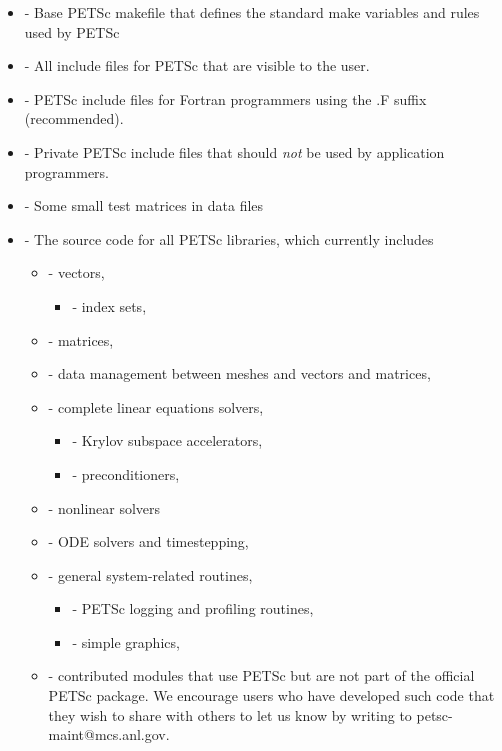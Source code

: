 \begin{itemize}
\item {} - Base PETSc makefile that defines the standard make variables and rules used by PETSc
\item {} - All include files for PETSc that are visible to the user.
\item {}    - PETSc include files for Fortran programmers using
                                  the .F suffix (recommended).
\item {}    - Private PETSc include files that should {\em not}
                                  be used by application programmers.
\item {} - Some small test matrices in data files
\item {} - The source code for all PETSc libraries, which
                  currently includes
 \begin{itemize}
 \item {} - vectors,
   \begin{itemize}
     \item {} - index sets,
   \end{itemize}
 \item {} - matrices,
 \item {} - data management between meshes and vectors and matrices,
 \item {} - complete linear equations solvers,
 \begin{itemize}
   \item {} - Krylov subspace accelerators,
   \item {} - preconditioners,
 \end{itemize}
 \item {} - nonlinear solvers
 \item {} - ODE solvers and timestepping,
 \item {} - general system-related routines,
 \begin{itemize}
   \item {} - PETSc logging and profiling routines,
   \item {} - simple graphics,
 \end{itemize}
 \item {} - contributed modules that use PETSc but are not
    part of the official PETSc package.  We encourage users who have
    developed such code that they wish to share with others to let us
    know by writing to petsc-maint@mcs.anl.gov.
 \end{itemize}
\end{itemize}

